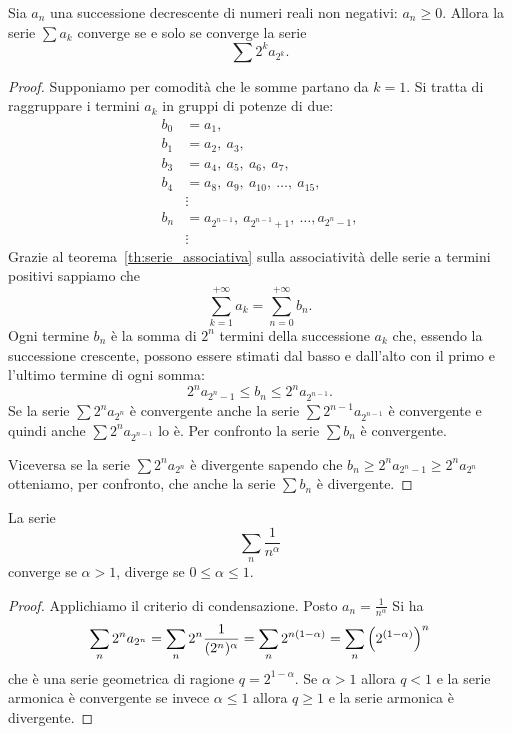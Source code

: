 \begin{theorem}%
\mymark{**}%
%
%
Sia $a_n$ una successione decrescente di numeri reali non negativi:
$a_n \ge 0$.
Allora la serie $\sum a_k$ converge se e solo se converge
la serie
\[
  \sum 2^k a_{2^k}.
\]
\end{theorem}
%
\begin{proof}
\mymark{**}
Supponiamo per comodità che le somme partano da $k=1$.
Si tratta di raggruppare i termini $a_k$ in gruppi di potenze di due:
\begin{align*}
  b_0 & = a_1, \\
  b_1 &= a_2,\ a_3, \\
  b_3 &= a_4,\ a_5,\ a_6,\ a_7, \\
  b_4 &= a_8,\ a_9,\ a_{10},\ \dots,\ a_{15}, \\
  &\vdots\\
  b_n &= a_{2^{n-1}},\ a_{2^{n-1}+1},\ \dots,a_{2^n-1},\\
  &\vdots
\end{align*}
Grazie al teorema~\ref{th:serie_associativa} sulla associatività
delle serie a termini positivi sappiamo che
  \[
  \sum_{k=1}^{+\infty} a_k = \sum_{n=0}^{+\infty} b_n.
  \]
Ogni termine $b_n$ è la somma di $2^n$ termini della
successione $a_k$ che, essendo la successione crescente,
possono essere stimati dal basso e dall'alto con il primo
e l'ultimo termine di ogni somma:
\[
  2^n a_{2^n-1} \le b_n \le 2^n a_{2^{n-1}}.
\]
Se la serie $\sum 2^n a_{2^n}$ è convergente
anche la serie $\sum 2^{n-1} a_{2^{n-1}}$ è convergente
e quindi anche $\sum 2^n a_{2^{n-1}}$ lo è.
Per confronto la serie $\sum b_n$ è convergente.

Viceversa se la serie $\sum 2^n a_{2^n}$ è divergente
sapendo che $b_n\ge 2^n a_{2^n-1}\ge 2^n a_{2^n}$
otteniamo, per confronto, che anche la serie $\sum b_n$ è divergente.
\end{proof}


\begin{corollary}
\mymark{***}
%
La serie
\[
 \sum_n \frac{1}{n^\alpha}
\]
converge se $\alpha>1$,
diverge se $0\le \alpha\le 1$.
\end{corollary}
%
\begin{proof}
\mymark{***}
Applichiamo il criterio di condensazione. Posto $a_n = \frac 1{n^\alpha}$ Si ha
\[
  \sum_n 2^n a_{2^n} = \sum_n 2^n \frac{1}{(2^n)^\alpha}
  = \sum_n 2^{n(1-\alpha)}
  = \sum_n {\left( 2^{(1-\alpha)} \right)}^n
\]
che è una serie geometrica di ragione $q=2^{1-\alpha}$.
Se $\alpha>1$ allora $q<1$ e la serie armonica è convergente
se invece $\alpha \le 1$ allora $q\ge 1$ e la serie
armonica è divergente.
\end{proof}

